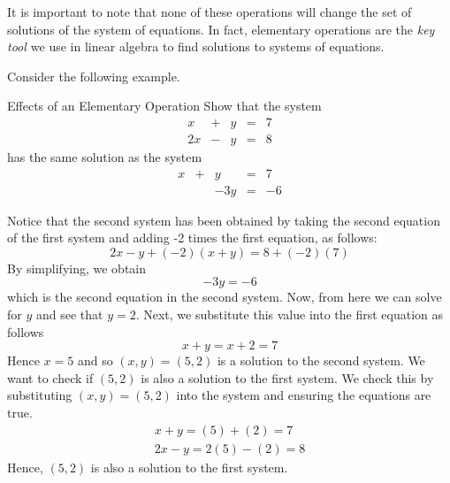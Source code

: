 It is important to note that none of these operations will 
change the set of solutions of the system of equations. In fact, elementary operations are the {\em key tool \em}we use in linear algebra to find solutions to systems of equations. 

Consider the following example.  

\begin{example}{Effects of an Elementary Operation}\label{exa:effectsofelementaryoperation}
\label{example:effectsofelementaryoperation}
Show that the system 
\begin{equation*}
\begin{array}{cccccc}
x&+&y&=&7 \\
2x&-&y&=&8
\end{array}
\end{equation*}
has the same solution as the system 
\begin{equation*}
\begin{array}{cccccc}
x&+&y&=&7 \\
&&-3y&=&-6
\end{array}
\end{equation*}
\end{example}

\begin{solution}
Notice that the second system has been obtained by taking the second equation of the first system
and adding -2 times the first equation, as follows:
\begin{equation*}
2x-y + (-2)(x+y) = 8 + (-2)(7)
\end{equation*}
By simplifying, we obtain
\begin{equation*}
-3y=-6
\end{equation*}
which is the second equation in the second system.
Now, from here we can solve for $y$ and see that $y=2$. Next, we substitute this value into the first equation as follows \:
\begin{equation*}
x+y=x+2=7
\end{equation*}
Hence $x=5$ and so $\left( x,y\right) = \left(5,2 \right)$ is a solution to the second system.  
We want to check if $\left(5,2 \right)$ is also a solution to the first system. We check this by substituting $\left(x, y \right) = \left(5,2 \right)$
into the system and ensuring the equations are true.
\begin{equation*}
\begin{array}{c}
x+y = \left(5 \right)+ \left( 2 \right) = 7 \\
2x-y= 2 \left(5 \right) - \left( 2 \right) = 8
\end{array}
\end{equation*}
Hence, $\left(5,2 \right)$ is also a solution to the first system. 
\end{solution}

